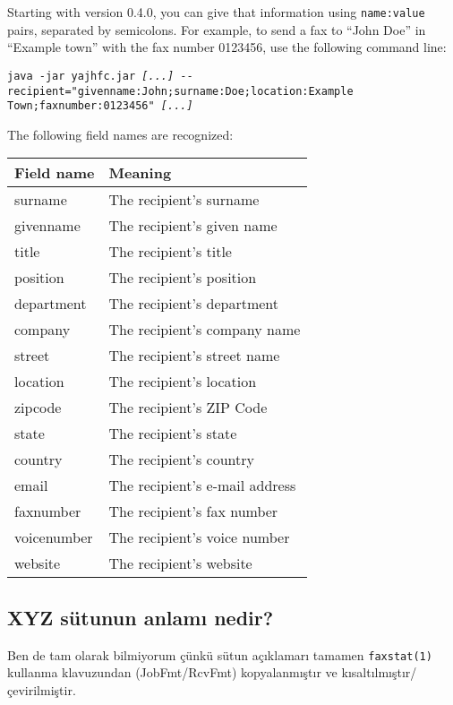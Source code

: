 \documentclass[a4paper,10pt]{scrartcl}
\begin{document}
Starting with version 0.4.0, you can give that information using \texttt{name:value} pairs, separated by semicolons. For example, to send a fax to ``John Doe'' in ``Example town'' with the fax number 0123456, use the following command line:

\texttt{java -jar yajhfc.jar \textit{[...]} -{-}recipient="givenname:John;surname:Doe;location:Example Town;faxnumber:0123456" \textit{[...]}}

The following field names are recognized:
\begin{center}
\begin{tabular}{|l|p{}|}
\hline
\bfseries Field name & \bfseries Meaning \\
\hline\hline
\ttfamily surname & The recipient's surname\\\hline
\ttfamily givenname & The recipient's given name \\\hline
\ttfamily title & The recipient's title \\\hline
\ttfamily position & The recipient's position \\\hline
\ttfamily department & The recipient's department\\\hline
\ttfamily company & The recipient's company name\\\hline
\ttfamily street & The recipient's street name \\\hline
\ttfamily location & The recipient's location\\\hline
\ttfamily zipcode & The recipient's ZIP Code \\\hline
\ttfamily state & The recipient's state\\\hline
\ttfamily country & The recipient's country\\\hline
\ttfamily email & The recipient's e-mail address\\\hline
\ttfamily faxnumber & The recipient's fax number \\\hline
\ttfamily voicenumber & The recipient's voice number \\\hline
\ttfamily website & The recipient's website\\\hline
\end{tabular}
\end{center}

\subsection{XYZ sütunun anlamı nedir?}

Ben de tam olarak bilmiyorum çünkü sütun açıklamarı 
tamamen \verb.faxstat(1). kullanma klavuzundan (JobFmt/RcvFmt) kopyalanmıştır
ve kısaltılmıştır/çevirilmiştir. 
\end{document}
